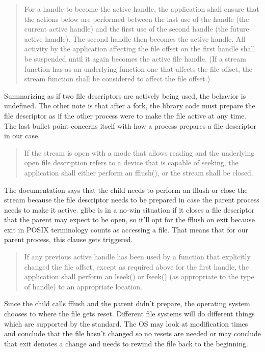 \begin{quote}
For a handle to become the active handle, the application shall ensure that the actions below are performed between the last use of the handle (the current active handle) and the first use of the second handle (the future active handle). The second handle then becomes the active handle. All activity by the application affecting the file offset on the first handle shall be suspended until it again becomes the active file handle. (If a stream function has as an underlying function one that affects the file offset, the stream function shall be considered to affect the file offset.)
\end{quote}

Summarizing as if two file descriptors are actively being used, the behavior is undefined.
The other note is that after a fork, the library code must prepare the file descriptor as if the other process were to make the file active at any time.
The last bullet point concerns itself with how a process prepares a file descriptor in our case.

\begin{quote}
If the stream is open with a mode that allows reading and the underlying open file description refers to a device that is capable of seeking, the application shall either perform an fflush(), or the stream shall be closed.
\end{quote}

The documentation says that the child needs to perform an fflush or close the stream because the file descriptor needs to be prepared in case the parent process needs to make it active.
glibc is in a no-win situation if it closes a file descriptor that the parent may expect to be open, so it'll opt for the fflush on exit because exit in POSIX terminology counts as accessing a file.
That means that for our parent process, this clause gets triggered.

\begin{quote}
If any previous active handle has been used by a function that explicitly changed the file offset, except as required above for the first handle, the application shall perform an lseek() or fseek() (as appropriate to the type of handle) to an appropriate location.
\end{quote}

Since the child calls fflush and the parent didn't prepare, the operating system chooses to where the file gets reset.
Different file systems will do different things which are supported by the standard.
The OS may look at modification times and conclude that the file hasn't changed so no resets are needed or may conclude that exit denotes a change and needs to rewind the file back to the beginning.


